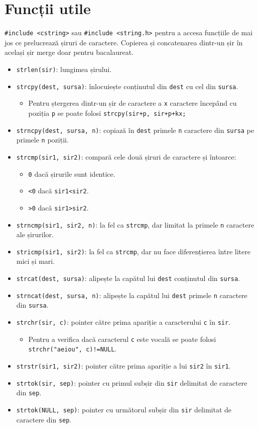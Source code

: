 \documentclass{article}
\begin{document}
\section*{Funcții utile}
\verb|#include <cstring>| sau \verb|#include <string.h>| pentru a accesa funcțiile de mai jos ce prelucrează șiruri de caractere. Copierea și concatenarea dintr-un șir în același șir merge doar pentru bacalaureat.
\begin{itemize}
    \item \verb|strlen(sir)|: lungimea șirului.
    \item \verb|strcpy(dest, sursa)|: înlocuiește conținutul din \verb|dest| cu cel din \verb|sursa|.
    \begin{itemize}
        \item Pentru ștergerea dintr-un șir de caractere a \verb|x| caractere începând cu poziția \verb|p| se poate folosi \verb|strcpy(sir+p, sir+p+kx;|
    \end{itemize}
    \item \verb|strncpy(dest, sursa, n)|: copiază în \verb|dest| primele \verb|n| caractere din \verb|sursa| pe primele \verb|n| poziții.
    \item \verb|strcmp(sir1, sir2)|: compară cele două șiruri de caractere și întoarce:
    \begin{itemize}
        \item \verb|0| dacă șirurile sunt identice.
        \item \verb|<0| dacă \verb|sir1<sir2|.
        \item \verb|>0| dacă \verb|sir1>sir2|.
    \end{itemize}
    \item \verb|strncmp(sir1, sir2, n)|: la fel ca \verb|strcmp|, dar limitat la primele \verb|n| caractere ale șirurilor.
    \item \verb|stricmp(sir1, sir2)|: la fel ca \verb|strcmp|, dar nu face diferențierea între litere mici și mari.
    \item \verb|strcat(dest, sursa)|: alipește la capătul lui \verb|dest| conținutul din \verb|sursa|.
    \item \verb|strncat(dest, sursa, n)|: alipește la capătul lui \verb|dest| primele \verb|n| caractere din \verb|sursa|.
    \item \verb|strchr(sir, c)|: pointer către prima apariție a caracterului \verb|c| în \verb|sir|.
    \begin{itemize}
        \item Pentru a verifica dacă caracterul \verb|c| este vocală se poate folosi \verb|strchr("aeiou", c)!=NULL|.
    \end{itemize}
    \item \verb|strstr(sir1, sir2)|: pointer către prima apariție a lui \verb|sir2| în \verb|sir1|.
    \item \verb|strtok(sir, sep)|: pointer cu primul subșir din \verb|sir| delimitat de caractere din \verb|sep|.
    \item \verb|strtok(NULL, sep)|: pointer cu următorul subșir din \verb|sir| delimitat de caractere din \verb|sep|.
\end{itemize}
\end{document}
